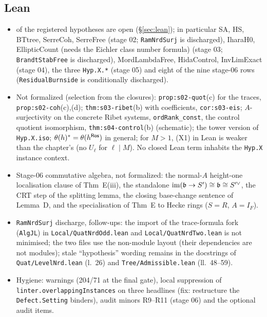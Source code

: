 \subsection{Lean}
\begin{itemize}
\item \NumHypOpen{} of the \NumHypRegistered{} registered hypotheses are open (\S\ref{sec:lean}); in particular SA, HS, BTtree, SerreCoh, SerreFree
  (stage 02; \texttt{RamNrdSurj} is discharged), IharaH0, EllipticCount (needs the Eichler class number formula) (stage 03; \texttt{BrandtStabFree} is discharged),
  MordLambdaFree, HidaControl, InvLimExact (stage 04), the three \texttt{Hyp.X.*} (stage 05) and eight of the nine stage-06 rows (\texttt{ResidualBurnside} is
  conditionally discharged).
\item Not formalized (selection from the closures): \texttt{prop:s02-quot}(c) for the traces, \texttt{prop:s02-coh}(c),(d);
  \texttt{thm:s03-ribet}(b) with coefficients, \texttt{cor:s03-eis}; $A$-surjectivity on the concrete Ribet systems,
  \texttt{ordRank\_const}, the control quotient isomorphism, \texttt{thm:s04-control}(b) (schematic); the tower version of
  \texttt{Hyp.X.iso}; $\theta(h)^*=\theta(h^{\mathsf{Ros}})$ in general; for $M>1$, (X1) in Lean is weaker than the chapter's (no
  $U_\ell$ for $\ell\mid M$). No closed Lean term inhabits the \texttt{Hyp.X} instance context.
\item Stage-06 commutative algebra, not formalized: the normal-$A$ height-one localisation clause of Thm~E(iii), the
  standalone $\operatorname{im}(\mathfrak{b}\to S')\cong\mathfrak{b}\cong S'^\vee$, the CRT step of the splitting lemma, the closing base-change
  sentence of Lemma~D, and the specialisation of Thm~E to Hecke rings ($S=R$, $A=I_F$).
\item \texttt{RamNrdSurj} discharge, follow-ups: the import of the trace-formula fork (\texttt{AlgJL}) in
  \texttt{Local/QuatNrdOdd.lean} and \texttt{Local/QuatNrdTwo.lean} is not minimised; the two files use the non-module layout
  (their dependencies are not modules); stale ``hypothesis'' wording remains in the docstrings of
  \texttt{Quat/LevelNrd.lean} (l.~26) and \texttt{Tree/Admissible.lean} (ll.~48--59).
\item Hygiene: warnings (204/71 at the final gate), local suppression of \texttt{linter.overlappingInstances} on three
  headlines (fix: restructure the \texttt{Defect.Setting} binders), audit minors R9--R11 (stage 06) and the optional audit items.
\end{itemize}


